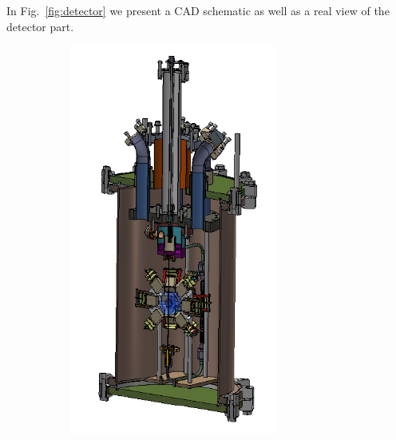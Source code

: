 In Fig.~\ref{fig:detector} we present a CAD schematic as well as a real view of the detector part.

\begin{figure}
	\centering
    \begin{subfigure}[c]{0.45\textwidth}
		\includegraphics[width=0.75\textwidth , height=0.3\textheight]{detCAD.png}%
	\end{subfigure}	
	\begin{subfigure}[c]{0.45\textwidth}

\end{subfigure}
\end{figure}
